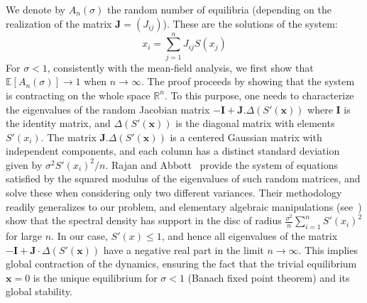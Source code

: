 We denote by $A_n(\sigma)$ the random number of equilibria (depending on the realization of the matrix ${\mathbf{J}}=(J_{ij})$). These are the solutions of the system:
\begin{equation}\label{eq:FP}
	x_i = \sum_{j=1}^n J_{ij}S(x_j) 
\end{equation}
For $\sigma<1$, consistently with the mean-field analysis, we first show that ${\mathbb{E}\left [ {A_n(\sigma)} \right]} \to 1$ when $n\to \infty$. The proof proceeds by showing that the system is contracting on the whole space ${\mathbb{R}}^n$. To this purpose, one needs to characterize the eigenvalues of the random Jacobian matrix $-{\mathbf{I}}+{\mathbf{J}}.\Delta (S'({\mathbf{x}}))$ where ${\mathbf{I}}$ is the identity matrix, and $\Delta(S'({\mathbf{x}}))$ is the diagonal matrix with elements $S'(x_i)$. The matrix ${\mathbf{J}}.\Delta (S'({\mathbf{x}}))$ is a centered Gaussian matrix with independent components, and each column has a distinct standard deviation given by $\sigma^2 S'(x_i)^2/n$. Rajan and Abbott~\cite{rajan-abbott:06} provide the system of equations satisfied by the squared modulus of the eigenvalues of such random matrices, and solve these when considering only two different variances. Their methodology readily generalizes to our problem, and elementary algebraic manipulations (see~\cite{garcia:masterthesis,yiwei}) show that the spectral density has support in the disc of radius $\frac {\sigma^2} n \sum_{i=1}^n{S'(x_i)^2}$ for large $n$. In our case, $S'(x)\leq 1$, and hence all eigenvalues of the matrix $-{\mathbf{I}}+{\mathbf{J}}\cdot \Delta(S'({\mathbf{x}}))$ have a negative real part in the limit $n\to\infty$.  This implies global contraction of the dynamics, ensuring the fact that the trivial equilibrium ${\mathbf{x}}=0$ is the unique equilibrium for $\sigma<1$ (Banach fixed point theorem) and its global stability. 

